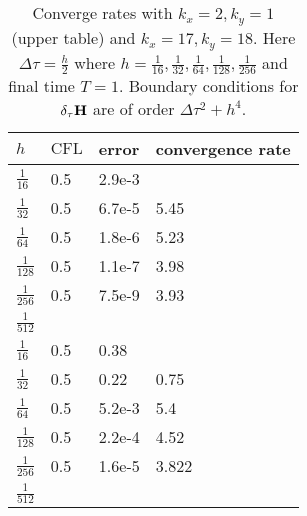 \documentclass[12pt,reqno]{amsart}
\newcommand{\h}{{\bf H}}
\theoremstyle{definition}
\numberwithin{equation}{section}
\begin{document}
		\begin{table} [h!]
			\centering
			\begin{tabular}{|p{0.7cm}|p{0.7cm}|p{2cm}| |p{4cm}|}
				\hline
				$h$ & $\mathrm{CFL}$ &error& convergence rate
				\\ [0.5ex] 
				\hline 
				$\frac{1}{16}$ & 0.5& 2.9e-3&  \\[0.5mm]
				$\frac{1}{32}$ & 0.5 &6.7e-5 &5.45\\[0.5mm]
				$\frac{1}{64}$ & 0.5 & 1.8e-6 &5.23 \\[0.5mm]
				$\frac{1}{128}$ & 0.5 &1.1e-7 & 3.98\\[0.5mm]
				$\frac{1}{256}$ & 0.5& 7.5e-9 &3.93 \\[0.5mm]
					$\frac{1}{512}$ & &  & \\[0.5mm]
				\hline \hline
				$\frac{1}{16}$ & 0.5& 0.38&  \\[0.5mm]
				$\frac{1}{32}$ & 0.5 &0.22 &0.75\\[0.5mm]
				$\frac{1}{64}$ & 0.5 & 5.2e-3 &5.4 \\[0.5mm]
				$\frac{1}{128}$ & 0.5 &2.2e-4 & 4.52\\[0.5mm]
				$\frac{1}{256}$ & 0.5& 1.6e-5 &3.822 \\[0.5mm]
					$\frac{1}{512}$ & &  & \\[0.5mm]
				\hline
			\end{tabular}
			\caption{ Converge rates with $k_x=2,k_y=1$ (upper table)
				and  $k_x=17,k_y=18$.
				Here $\Delta \tau=\frac{h}{2}$ where $h=\frac{1}{16},\frac{1}{32},\frac{1}{64},
				\frac{1}{128}, \frac{1}{256}
				$
				and final time $T=1$. Boundary conditions for $\delta_{\tau}\h$ are of order $\Delta \tau^2+h^4$.}
			\label{table:conv_rates_2}
			
			
		\end{table}
	\newpage
\end{document}
